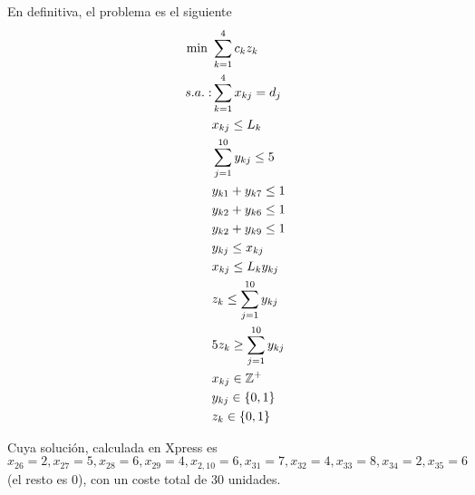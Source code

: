 \documentclass[twoside]{article}
\begin{document}
\begin{solucion}
En definitiva, el problema es el siguiente
\begin{align*}
\min\ & \sum_{k=1}^4c_kz_{k}\\
s.a.: & \sum_{k=1}^4 x_{kj}=d_j\\
      & x_{kj}\leq L_k\\
      &\sum_{j=1}^{10} y_{kj}\leq 5\\
      &y_{k1}+y_{k7}\leq 1\\
	  &y_{k2}+y_{k6}\leq 1\\
	  &y_{k2}+y_{k9}\leq 1\\
	  &y_{kj}\leq x_{kj}\\
	  &x_{kj}\leq L_k y_{kj}\\
	  &z_k\leq \sum_{j=1}^{10}y_{kj}\\
	  &5z_k\geq \sum_{j=1}^{10}y_{kj}\\
	  &x_{kj}\in\mathbb{Z}^+\\
      &y_{kj}\in\{0,1\}\\
      &z_k\in\{0,1\}
\end{align*}

Cuya solución, calculada en Xpress es $x_{26}=2, x_{27}=5, x_{28}=6, x_{29}=4, x_{2,10}=6, x_{31}=7, x_{32}=4, x_{33}=8, x_{34}=2,x_{35}=6$ (el resto es 0), con un coste total de 30 unidades.

\end{solucion}
\end{document}
